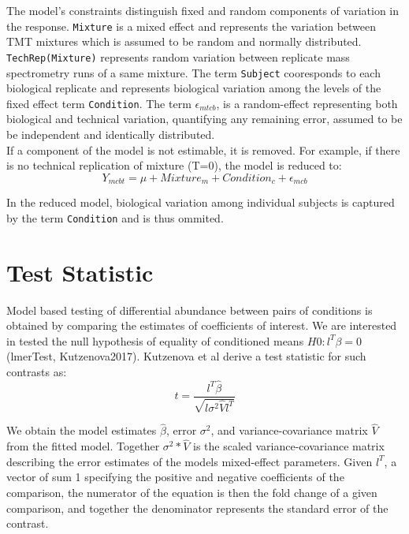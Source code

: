 \documentclass[11pt]{elife}\usepackage[]{graphicx}\usepackage[]{color}
\begin{document}
The model's constraints distinguish fixed and random components of 
variation in the response. \texttt{Mixture} is a mixed effect and 
represents the variation between TMT mixtures which is assumed to be random 
and normally distributed. \texttt{TechRep(Mixture)} represents random variation 
between replicate mass spectrometry runs of a same mixture. 
The term \texttt{Subject} cooresponds to each biological replicate and 
represents biological variation among the levels of the fixed effect term
\texttt{Condition}. The term $\epsilon_{mtcb}$,
is a random-effect representing both biological and technical variation, 
quantifying any remaining error, assumed to be be independent 
and identically distributed.\\

If a component of the model is not estimable, it is removed. 
For example, if there is
no technical replication of mixture (T=0), the model is reduced to: \\

\begin{equation} 
	Y_{mcbt} = \mu + Mixture_m + Condition_c + \epsilon_{mcb}
\end{equation}

In the reduced model, biological variation among individual subjects is 
captured by the term \texttt{Condition} and is thus ommited.\\


\section{Test Statistic}

Model based testing of differential abundance between pairs of conditions
is obtained by comparing the estimates of coefficients of interest. 
We are interested in tested the null hypothesis of 
equality of conditioned means $H0 : l^T\beta = 0$ (lmerTest, Kutzenova2017).
Kutzenova et al derive a test statistic for such contrasts as:\\

\begin{equation}
	t = \frac{l^T \hat{\beta}}{\sqrt{l \sigma^2 \hat{V} l^T}}
\end{equation}

We obtain the model estimates $\hat{\beta}$, 
error $\sigma^2$, and
variance-covariance matrix $\hat{V}$ from the fitted model. 
Together $\sigma^2 * \hat{V}$ is the scaled variance-covariance matrix
describing the error estimates of the models mixed-effect parameters. 
Given $l^T$, a vector of sum 1 specifying the positive and negative
coefficients of the comparison, the numerator of the equation is then
the fold change of a given comparison, and together the denominator 
represents the standard error of the contrast. \\
\end{document}
